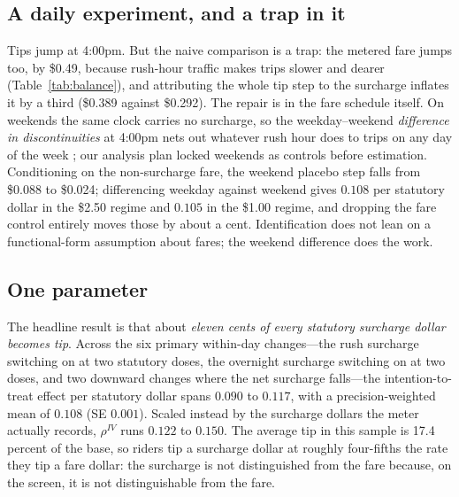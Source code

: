 \subsection{A daily experiment, and a trap in it}
Tips jump at 4:00pm. But the naive comparison is a trap: the metered
fare jumps too, by \$0.49, because rush-hour traffic makes trips slower
and dearer (Table~\ref{tab:balance}), and attributing the whole tip step
to the surcharge inflates it by a third (\$0.389 against \$0.292).
The repair is in the fare schedule itself. On weekends the same clock
carries no surcharge, so the weekday--weekend \emph{difference in
discontinuities} at 4:00pm nets out whatever rush hour does to trips on
any day of the week \parencite{grembi2016difference}; our analysis plan
locked weekends as controls before estimation. Conditioning on the
non-surcharge fare, the weekend placebo step falls from \$0.088 to
\$0.024; differencing weekday against weekend gives $0.108$ per
statutory dollar in the \$2.50 regime and $0.105$ in the \$1.00 regime,
and dropping the fare control entirely moves those by about a cent.
Identification does not lean on a functional-form assumption about
fares; the weekend difference does the work.

\subsection{One parameter}
The headline result is that about \emph{eleven cents of every statutory
surcharge dollar becomes tip}. Across the six primary within-day
changes---the rush surcharge switching on at two statutory doses, the
overnight surcharge switching on at two doses, and two downward changes
where the net surcharge falls---the intention-to-treat effect per
statutory dollar spans $0.090$ to $0.117$, with a precision-weighted
mean of $0.108$ (SE $0.001$). Scaled instead by the surcharge dollars
the meter actually records, $\rho^{IV}$ runs $0.122$ to $0.150$. The
average tip in this sample is 17.4 percent of the base, so riders tip a
surcharge dollar at roughly four-fifths the rate they tip a fare
dollar: the surcharge is not distinguished from the fare because, on
the screen, it is not distinguishable from the fare.

